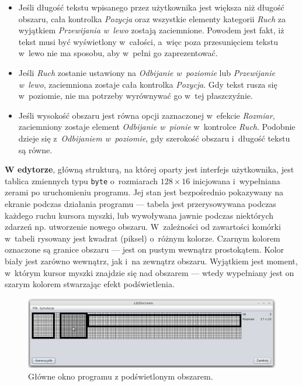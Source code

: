 \begin{itemize}
	\item Jeśli długość tekstu wpisanego przez użytkownika jest większa niż długość obszaru, cała kontrolka \textit{Pozycja} oraz wszystkie elementy kategorii \textit{Ruch} za wyjątkiem \textit{Przewijania w~lewo} zostają zaciemnione. Powodem jest fakt, iż tekst musi być wyświetlony w~całości, a~więc poza przesunięciem tekstu w~lewo nie ma sposobu, aby w~pełni go zaprezentować.
	\item Jeśli \textit{Ruch} zostanie ustawiony na \textit{Odbijanie w~poziomie} lub \textit{Przewijanie w~lewo}, zaciemniona zostaje cała kontrolka \textit{Pozycja}. Gdy tekst rusza się w~poziomie, nie ma potrzeby wyrównywać go w~tej płaszczyźnie.
	\item Jeśli wysokość obszaru jest równa opcji zaznaczonej w~efekcie \textit{Rozmiar}, zaciemniony zostaje element \textit{Odbijanie w~pionie} w~kontrolce \textit{Ruch}. Podobnie dzieje się z~\textit{Odbijaniem w~poziomie}, gdy szerokość obszaru i~długość tekstu są równe.
\end{itemize}




\textbf{W edytorze}, główną strukturą, na której oparty jest interfejs użytkownika, jest tablica zmiennych typu \texttt{byte} o~rozmiarach $128 \times 16$ inicjowana i~wypełniana zerami po uruchomieniu programu. Jej stan jest bezpośrednio pokazywany na ekranie podczas działania programu --- tabela jest przerysowywana podczas każdego ruchu kursora myszki, lub wywoływana jawnie podczas niektórych zdarzeń np. utworzenie nowego obszaru. W~zależności od zawartości komórki w~tabeli rysowany jest kwadrat (piksel) o~różnym kolorze. Czarnym kolorem oznaczone są granice obszaru --- jest on pustym wewnątrz prostokątem. Kolor biały jest zarówno wewnątrz, jak i~na zewnątrz obszaru. Wyjątkiem jest moment, w~którym kursor myszki znajdzie się nad obszarem --- wtedy wypełniany jest on szarym kolorem stwarzając efekt podświetlenia.

\begin{figure}[htb]
	\begin{center}
		\includegraphics[width=\textwidth]{figures/gui2.png}
	\end{center}
	\caption{Główne okno programu z podświetlonym obszarem.}
\end{figure}

